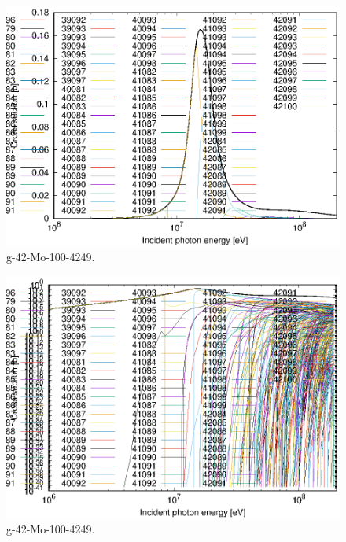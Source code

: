 \begin{figure}
 \includegraphics[width=\linewidth]{eps/g_42-Mo-100_4249.eps}
  \caption{g-42-Mo-100-4249.}
\end{figure}
\begin{figure}
 \includegraphics[width=\linewidth]{eps-log/g_42-Mo-100_4249.eps}
 \caption{g-42-Mo-100-4249.}
\end{figure}
\newpage \clearpage

